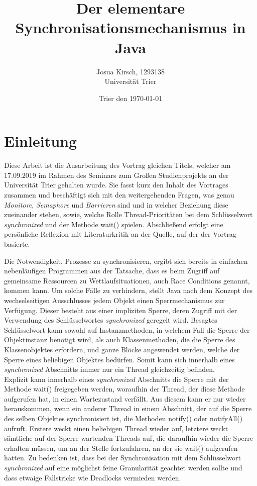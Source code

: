 \documentclass[12pt, onecolumn,notitlepage]{scrartcl}
\begin{document}
\title{Der elementare Synchronisationsmechanismus in Java}

\author{Josua Kirsch, 1293138\\Universität Trier}
\date{Trier den \today}

\newcommand{\define}[1]{\color{darkorange}Definition: \color{black}{#1}\\  } 



\maketitle
\tableofcontents


\section{Einleitung}
Diese Arbeit ist die Ausarbeitung des Vortrag gleichen Titels, welcher am 17.09.2019 im Rahmen des Seminars zum Großen Studienprojekts an der Universität Trier gehalten wurde. Sie fasst kurz den Inhalt des Vortrages zusammen und beschäftigt sich mit den weitergehenden Fragen, was genau \textit{Monitore}, \textit{Semaphore} und \textit{Barrieren} sind und in welcher Beziehung diese zueinander stehen, sowie, welche Rolle Thread-Prioritäten bei dem Schlüsselwort \textit{synchronized} und der Methode wait() spielen. Abschließend erfolgt eine persönliche Reflexion mit Literaturkritik an der Quelle, auf der der Vortrag basierte. \par 
Die Notwendigkeit, Prozesse zu synchronisieren, ergibt sich bereits in einfachen nebenläufigen Programmen aus der Tatsache, dass es beim Zugriff auf gemeinsame Ressourcen zu Wettlaufsituationen, auch Race Conditions genannt, kommen kann. Um solche Fälle zu verhindern, stellt Java nach dem Konzept des wechselseitigen Ausschlusses jedem Objekt einen Sperrmechanismus zur Verfügung. Dieser besteht aus einer impliziten Sperre, deren Zugriff mit der Verwendung des Schlüsselwortes \textit{synchronized} geregelt wird. Besagtes Schlüsselwort kann sowohl auf Instanzmethoden, in welchem Fall die Sperre der Objektinstanz benötigt wird, als auch Klassenmethoden, die die Sperre des Klassenobjektes erfordern, und ganze Blöcke angewendet werden, welche der Sperre eines beliebigen Objektes bedürfen. Somit kann sich innerhalb eines \textit{synchronized} Abschnitts immer nur ein Thread gleichzeitig befinden.\\
Explizit kann innerhalb eines \textit{synchronized} Abschnitts die Sperre mit der Methode wait() freigegeben werden, woraufhin der Thread, der diese Methode aufgerufen hat, in einen Wartezustand verfällt. Aus diesem kann er nur wieder herauskommen, wenn ein anderer Thread in einem Abschnitt, der auf die Sperre des selben Objektes synchronisiert ist, die Methoden notify() oder notifyAll() aufruft. Erstere weckt einen beliebigen Thread wieder auf, letztere weckt sämtliche auf der Sperre wartenden Threads auf, die daraufhin wieder die Sperre erhalten müssen, um an der Stelle fortzufahren, an der sie wait() aufgerufen hatten. Zu bedenken ist, dass bei der Synchronisation mit dem Schlüsselwort \textit{synchronized} auf eine möglichst feine Granularität geachtet werden sollte und dass etwaige Fallstricke wie Deadlocks vermieden werden.
\end{document}
